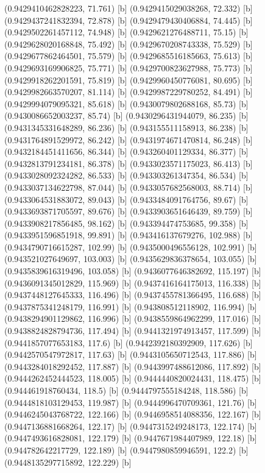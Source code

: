 {{{(0.9429410462828223, 71.761) [b] 
(0.9429415029038268, 72.332) [b] 
(0.9429437241832394, 72.878) [b] 
(0.9429479430406884, 74.445) [b] 
(0.9429502261457112, 74.948) [b] 
(0.9429621276488711, 75.15) [b] 
(0.9429628020168848, 75.492) [b] 
(0.9429670208743338, 75.529) [b] 
(0.9429677862464501, 75.579) [b] 
(0.9429685516185663, 75.613) [b] 
(0.9429693169906825, 75.771) [b] 
(0.9429700823627988, 75.773) [b] 
(0.9429918262201591, 75.819) [b] 
(0.9429960450776081, 80.695) [b] 
(0.9429982663570207, 81.114) [b] 
(0.9429987229780252, 84.491) [b] 
(0.9429994079095321, 85.618) [b] 
(0.9430079802688168, 85.73) [b] 
(0.9430086652003237, 85.74) [b] 
(0.9430296431944079, 86.235) [b] 
(0.9431345331648289, 86.236) [b] 
(0.943155511158913, 86.238) [b] 
(0.9431764891529972, 86.242) [b] 
(0.9431974671470814, 86.248) [b] 
(0.9432184451411656, 86.344) [b] 
(0.943260401129334, 86.377) [b] 
(0.9432813791234181, 86.378) [b] 
(0.9433023571175023, 86.413) [b] 
(0.9433028092324282, 86.533) [b] 
(0.943303261347354, 86.534) [b] 
(0.9433037134622798, 87.044) [b] 
(0.9433057682568003, 88.714) [b] 
(0.9433064531883072, 89.043) [b] 
(0.9433484091764756, 89.67) [b] 
(0.9433693871705597, 89.676) [b] 
(0.9433903651646439, 89.759) [b] 
(0.9433908217856485, 98.162) [b] 
(0.943394474753685, 99.358) [b] 
(0.9433951596851918, 99.891) [b] 
(0.943416137679276, 102.988) [b] 
(0.9434790716615287, 102.99) [b] 
(0.9435000496556128, 102.991) [b] 
(0.943521027649697, 103.003) [b] 
(0.9435629836378654, 103.055) [b] 
(0.9435839616319496, 103.058) [b] 
(0.9436077646382692, 115.197) [b] 
(0.9436091345012829, 115.969) [b] 
(0.9437416164175013, 116.338) [b] 
(0.9437448127645333, 116.496) [b] 
(0.9437455781366495, 116.688) [b] 
(0.9437875341248179, 116.991) [b] 
(0.943808512118902, 116.994) [b] 
(0.9438294901129862, 116.996) [b] 
(0.9438559864962299, 117.016) [b] 
(0.9438824828794736, 117.494) [b] 
(0.9441321974913457, 117.599) [b] 
(0.9441857077653183, 117.6) [b] 
(0.9442392180392909, 117.626) [b] 
(0.9442570547972817, 117.63) [b] 
(0.9443105650712543, 117.886) [b] 
(0.9443284018292452, 117.887) [b] 
(0.9443997488612086, 117.892) [b] 
(0.9444262452444523, 118.005) [b] 
(0.9444440820024431, 118.475) [b] 
(0.944461918760434, 118.5) [b] 
(0.9444797555184248, 118.586) [b] 
(0.9444818103129453, 119.987) [b] 
(0.9444996470709361, 121.76) [b] 
(0.9446245043768722, 122.166) [b] 
(0.9446958514088356, 122.167) [b] 
(0.9447136881668264, 122.17) [b] 
(0.9447315249248173, 122.174) [b] 
(0.9447493616828081, 122.179) [b] 
(0.9447671984407989, 122.18) [b] 
(0.944782642217729, 122.189) [b] 
(0.9447980859946591, 122.2) [b] 
(0.9448135297715892, 122.229) [b] 
}}}
